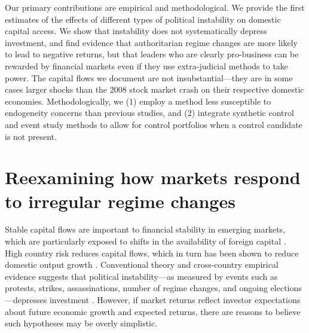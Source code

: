 \documentclass[12pt,final,fleqn]{article}
\theoremstyle{plain}
\begin{document}
Our primary contributions are empirical and methodological. We provide the first estimates of the effects of different types of political instability on domestic capital access. We show that instability does not systematically depress investment, and find evidence that authoritarian regime changes are more likely to lead to negative returns, but that leaders who are clearly pro-business can be rewarded by financial markets even if they use extra-judicial methods to take power. The capital flows we document are not insubstantial---they are in some cases larger shocks than the 2008 stock market crash on their respective domestic economies. Methodologically, we (1) employ a method less susceptible to endogeneity concerns than previous studies, and (2) integrate synthetic control and event study methods to allow for control portfolios when a control candidate is not present.

\singlespacing
\section{Reexamining how markets respond to irregular regime changes}
\doublespacing

Stable capital flows are important to financial stability in emerging markets, which are particularly exposed to shifts in the availability of foreign capital \citep{koepke2019drives, obstfeld2012financial, cohen2017global}. High country risk reduces capital flows, which in turn has been shown to reduce domestic output growth \citep{koepke2019drives}. Conventional theory and cross-country empirical evidence suggests that political instability---as measured by events such as protests, strikes, assassinations, number of regime changes, and ongoing elections---depresses investment \citep{irshad2017relationship, le2006political, lensink2000capital, boutchkova2012precarious, lehkonen2015democracy}. However, if market returns reflect investor expectations about future economic growth and expected returns, there are reasons to believe such hypotheses may be overly simplistic. 
\end{document}

